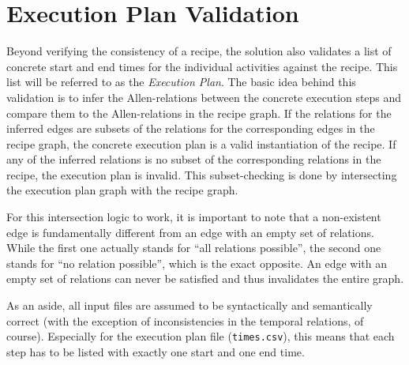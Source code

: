     \section{Execution Plan Validation}
    
    Beyond verifying the consistency of a recipe, the solution also validates a
    list of concrete start and end times for the individual activities against the
    recipe. This list will be referred to as the \emph{Execution Plan}.
    The basic idea behind this validation is to infer the Allen-relations between the
    concrete execution steps and compare them to the Allen-relations in the
    recipe graph. If the relations for the inferred edges are subsets of the
    relations for the corresponding edges in the recipe graph, the concrete
    execution plan is a valid instantiation of the recipe. If any of the
    inferred relations is no subset of the corresponding relations in the
    recipe, the execution plan is invalid. This subset-checking is done by
    intersecting the execution plan graph with the recipe graph.
    
    For this
    intersection logic to work, it is important to note that a non-existent edge
    is fundamentally different from an edge with an empty set of relations.
    While the first one actually stands for ``all relations possible'', the
    second one stands for ``no relation possible'', which is the exact opposite.
    An edge with an empty set of
    relations can never be satisfied and thus invalidates the entire graph.

    As an aside, all input files are assumed to be syntactically and
    semantically correct (with the exception of inconsistencies in the temporal
    relations, of course). Especially for the execution plan file (\texttt{times.csv}),
    this means that each step has to be listed with exactly one start and one end time.